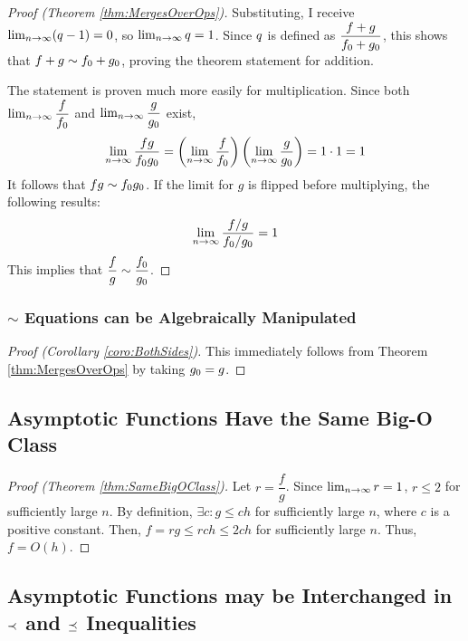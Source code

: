 \begin{proof}[Proof (Theorem \ref{thm:MergesOverOps})]
	Substituting, I receive $\lim_{n \to \infty} (q - 1) = 0$, so $\lim_{n \to \infty} q = 1$. Since $q$ is defined as $\dfrac{f + g}{f_0 + g_0}$, this shows that $f + g \sim f_0 + g_0$, proving the theorem statement for addition.
	
	The statement is proven much more easily for multiplication. Since both $\lim_{n \to \infty} \dfrac{f}{f_0}$ and $\lim_{n \to \infty} \dfrac{g}{g_0}$ exist,
	\begin{align*}
	\lim_{n \to \infty} \frac{fg}{f_0g_0} = \left( \lim_{n \to \infty} \frac{f}{f_0} \right) \left( \lim_{n \to \infty} \frac{g}{g_0} \right) = 1 \cdot 1 = 1
	\end{align*}
	It follows that $fg \sim f_0g_0$. If the limit for $g$ is flipped before multiplying, the following results:
	\begin{align*}
	\lim_{n \to \infty} \frac{f / g}{f_0 / g_0} = 1
	\end{align*}
	This implies that $\dfrac f g \sim \dfrac {f_0} {g_0}$.
\end{proof}

\subsubsection{$\sim$ Equations can be Algebraically Manipulated}

\begin{proof}[Proof (Corollary \ref{coro:BothSides})]
	This immediately follows from Theorem \ref{thm:MergesOverOps} by taking $g_0 = g$.
\end{proof}

\subsection{Asymptotic Functions Have the Same Big-O Class}

\begin{proof}[Proof (Theorem \ref{thm:SameBigOClass})]
	Let $r = \dfrac{f}{g}$. Since $\lim_{n \to \infty} r = 1$, $r \leq 2$ for sufficiently large $n$. By definition, $\exists c : g \leq c h$ for sufficiently large $n$, where $c$ is a positive constant. Then, $f = rg \leq rc h \leq 2c h$ for sufficiently large $n$. Thus, $f = O(h)$.
\end{proof}

\subsection{Asymptotic Functions may be Interchanged in $\prec$ and $\preceq$ Inequalities}

